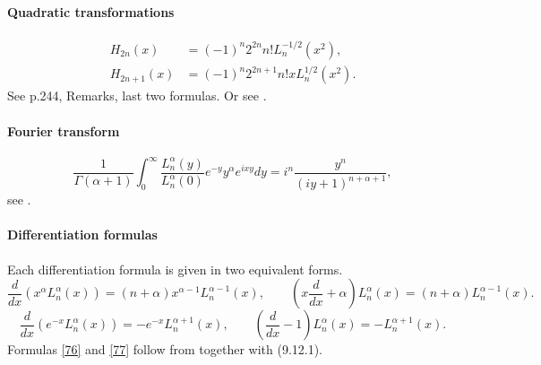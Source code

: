 \documentclass[twoside,11pt]{article}
\newcommand\al\alpha
\newcommand\Ga{\Gamma}
\newcommand\iy\infty
\begin{document}
\paragraph{Quadratic transformations}
\begin{align}
H_{2n}(x)&=(-1)^n 2^{2n} n! L_n^{-1/2}(x^2),
\label{54}\\
H_{2n+1}(x)&=(-1)^n 2^{2n+1} n! x L_n^{1/2}(x^2).
\label{55}
\end{align}
See p.244, Remarks, last two formulas.
Or see .
%
\paragraph{Fourier transform}
\begin{equation}
\frac1{\Ga(\al+1)} \int_0^\iy \frac{L_n^\al(y)}{L_n^\al(0)} 
e^{-y} y^\al e^{ixy} dy=
i^n \frac{y^n}{(iy+1)^{n+\al+1}} ,
\label{14}
\end{equation}
see .
%
\paragraph{Differentiation formulas}
Each differentiation formula is given in two equivalent forms.
\begin{equation}
\frac d{dx}\left(x^\al L_n^\al(x)\right)=
(n+\al) x^{\al-1} L_n^{\al-1}(x),\qquad
\left(x\frac d{dx}+\al\right)L_n^\al(x)=
(n+\al) L_n^{\al-1}(x).
\label{76}
\end{equation}
%
\begin{equation}
\frac d{dx}\left(e^{-x} L_n^\al(x)\right)=
-e^{-x} L_n^{\al+1}(x),\qquad
\left(\frac d{dx}-1\right)L_n^\al(x)=
-L_n^{\al+1}(x).
\label{77}
\end{equation}
%
Formulas \eqref{76} and \eqref{77} follow from
together with (9.12.1). 
%
\end{document}
